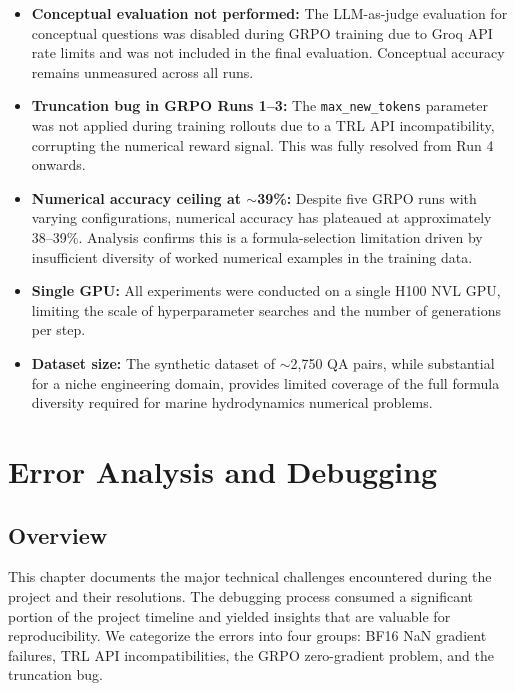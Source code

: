 \documentclass[12pt]{report}
\begin{document}
\begin{itemize}
    \item \textbf{Conceptual evaluation not performed:} The LLM-as-judge evaluation for conceptual questions was disabled during GRPO training due to Groq API rate limits and was not included in the final evaluation. Conceptual accuracy remains unmeasured across all runs.
    
    \item \textbf{Truncation bug in GRPO Runs 1--3:} The \texttt{max\_new\_tokens} parameter was not applied during training rollouts due to a TRL API incompatibility, corrupting the numerical reward signal. This was fully resolved from Run 4 onwards.
    
    \item \textbf{Numerical accuracy ceiling at $\sim$39\%:} Despite five GRPO runs with varying configurations, numerical accuracy has plateaued at approximately 38--39\%. Analysis confirms this is a formula-selection limitation driven by insufficient diversity of worked numerical examples in the training data.
    
    \item \textbf{Single GPU:} All experiments were conducted on a single H100 NVL GPU, limiting the scale of hyperparameter searches and the number of generations per step.
    
    \item \textbf{Dataset size:} The synthetic dataset of $\sim$2,750 QA pairs, while substantial for a niche engineering domain, provides limited coverage of the full formula diversity required for marine hydrodynamics numerical problems.
\end{itemize}


\chapter{Error Analysis and Debugging}

\section{Overview}

This chapter documents the major technical challenges encountered during the project and their resolutions. The debugging process consumed a significant portion of the project timeline and yielded insights that are valuable for reproducibility. We categorize the errors into four groups: BF16 NaN gradient failures, TRL API incompatibilities, the GRPO zero-gradient problem, and the truncation bug.
\end{document}
